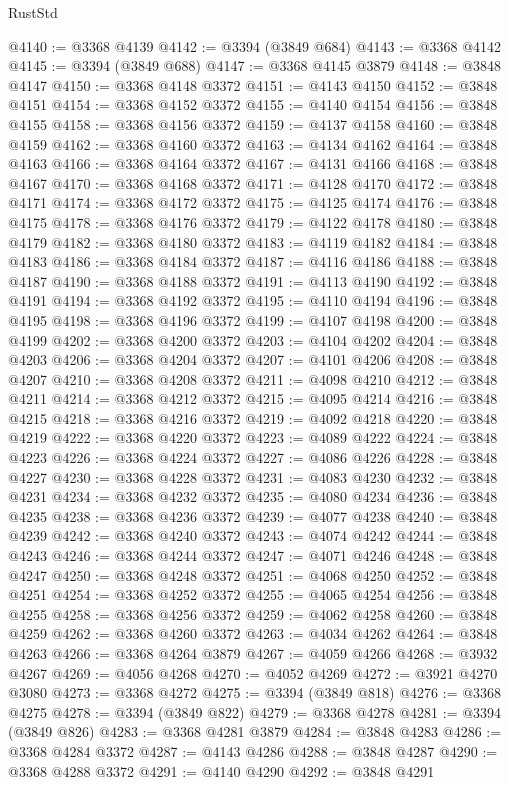 \begin{lexlean}{RustStd}
\begin{coremodule}
@4140 := @3368 @4139
@4142 := @3394 (@3849 @684)
@4143 := @3368 @4142
@4145 := @3394 (@3849 @688)
@4147 := @3368 @4145 @3879
@4148 := @3848 @4147
@4150 := @3368 @4148 @3372
@4151 := @4143 @4150
@4152 := @3848 @4151
@4154 := @3368 @4152 @3372
@4155 := @4140 @4154
@4156 := @3848 @4155
@4158 := @3368 @4156 @3372
@4159 := @4137 @4158
@4160 := @3848 @4159
@4162 := @3368 @4160 @3372
@4163 := @4134 @4162
@4164 := @3848 @4163
@4166 := @3368 @4164 @3372
@4167 := @4131 @4166
@4168 := @3848 @4167
@4170 := @3368 @4168 @3372
@4171 := @4128 @4170
@4172 := @3848 @4171
@4174 := @3368 @4172 @3372
@4175 := @4125 @4174
@4176 := @3848 @4175
@4178 := @3368 @4176 @3372
@4179 := @4122 @4178
@4180 := @3848 @4179
@4182 := @3368 @4180 @3372
@4183 := @4119 @4182
@4184 := @3848 @4183
@4186 := @3368 @4184 @3372
@4187 := @4116 @4186
@4188 := @3848 @4187
@4190 := @3368 @4188 @3372
@4191 := @4113 @4190
@4192 := @3848 @4191
@4194 := @3368 @4192 @3372
@4195 := @4110 @4194
@4196 := @3848 @4195
@4198 := @3368 @4196 @3372
@4199 := @4107 @4198
@4200 := @3848 @4199
@4202 := @3368 @4200 @3372
@4203 := @4104 @4202
@4204 := @3848 @4203
@4206 := @3368 @4204 @3372
@4207 := @4101 @4206
@4208 := @3848 @4207
@4210 := @3368 @4208 @3372
@4211 := @4098 @4210
@4212 := @3848 @4211
@4214 := @3368 @4212 @3372
@4215 := @4095 @4214
@4216 := @3848 @4215
@4218 := @3368 @4216 @3372
@4219 := @4092 @4218
@4220 := @3848 @4219
@4222 := @3368 @4220 @3372
@4223 := @4089 @4222
@4224 := @3848 @4223
@4226 := @3368 @4224 @3372
@4227 := @4086 @4226
@4228 := @3848 @4227
@4230 := @3368 @4228 @3372
@4231 := @4083 @4230
@4232 := @3848 @4231
@4234 := @3368 @4232 @3372
@4235 := @4080 @4234
@4236 := @3848 @4235
@4238 := @3368 @4236 @3372
@4239 := @4077 @4238
@4240 := @3848 @4239
@4242 := @3368 @4240 @3372
@4243 := @4074 @4242
@4244 := @3848 @4243
@4246 := @3368 @4244 @3372
@4247 := @4071 @4246
@4248 := @3848 @4247
@4250 := @3368 @4248 @3372
@4251 := @4068 @4250
@4252 := @3848 @4251
@4254 := @3368 @4252 @3372
@4255 := @4065 @4254
@4256 := @3848 @4255
@4258 := @3368 @4256 @3372
@4259 := @4062 @4258
@4260 := @3848 @4259
@4262 := @3368 @4260 @3372
@4263 := @4034 @4262
@4264 := @3848 @4263
@4266 := @3368 @4264 @3879
@4267 := @4059 @4266
@4268 := @3932 @4267
@4269 := @4056 @4268
@4270 := @4052 @4269
@4272 := @3921 @4270 @3080
@4273 := @3368 @4272
@4275 := @3394 (@3849 @818)
@4276 := @3368 @4275
@4278 := @3394 (@3849 @822)
@4279 := @3368 @4278
@4281 := @3394 (@3849 @826)
@4283 := @3368 @4281 @3879
@4284 := @3848 @4283
@4286 := @3368 @4284 @3372
@4287 := @4143 @4286
@4288 := @3848 @4287
@4290 := @3368 @4288 @3372
@4291 := @4140 @4290
@4292 := @3848 @4291

\end{coremodule}
\end{lexlean}
